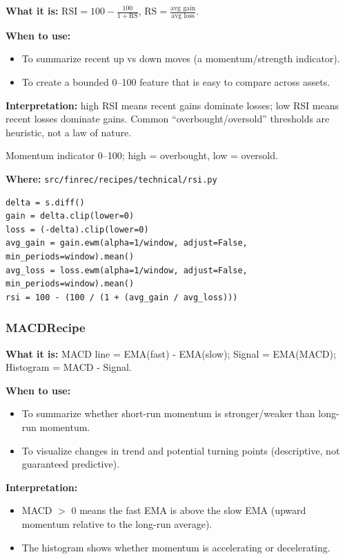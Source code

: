 \documentclass[11pt,a4paper]{article}
\begin{document}
\textbf{What it is:} $\text{RSI} = 100 - \frac{100}{1 + \text{RS}}$, $\text{RS} = \frac{\text{avg gain}}{\text{avg loss}}$.

\textbf{When to use:}
\begin{itemize}[leftmargin=2em]
  \item To summarize recent up vs down moves (a momentum/strength indicator).
  \item To create a bounded 0--100 feature that is easy to compare across assets.
\end{itemize}

\textbf{Interpretation:} high RSI means recent gains dominate losses; low RSI means recent losses dominate gains. Common ``overbought/oversold'' thresholds are heuristic, not a law of nature.

\begin{intuitionbox}
Momentum indicator 0--100; high = overbought, low = oversold.
\end{intuitionbox}

\textbf{Where:} \texttt{src/finrec/recipes/technical/rsi.py}

\begin{lstlisting}
delta = s.diff()
gain = delta.clip(lower=0)
loss = (-delta).clip(lower=0)
avg_gain = gain.ewm(alpha=1/window, adjust=False, min_periods=window).mean()
avg_loss = loss.ewm(alpha=1/window, adjust=False, min_periods=window).mean()
rsi = 100 - (100 / (1 + (avg_gain / avg_loss)))
\end{lstlisting}

\subsubsection{MACDRecipe}\label{sec:macd}

\textbf{What it is:} MACD line = EMA(fast) - EMA(slow); Signal = EMA(MACD); Histogram = MACD - Signal.

\textbf{When to use:}
\begin{itemize}[leftmargin=2em]
  \item To summarize whether short-run momentum is stronger/weaker than long-run momentum.
  \item To visualize changes in trend and potential turning points (descriptive, not guaranteed predictive).
\end{itemize}

\textbf{Interpretation:}
\begin{itemize}[leftmargin=2em]
  \item MACD \(>\) 0 means the fast EMA is above the slow EMA (upward momentum relative to the long-run average).
  \item The histogram shows whether momentum is accelerating or decelerating.
\end{itemize}
\end{document}
